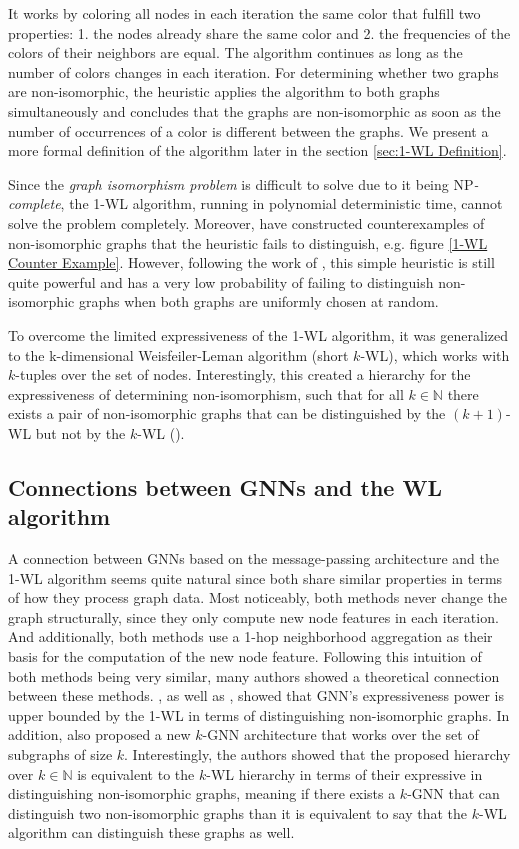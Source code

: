 \documentclass[11pt, dvipsnames, DIV=12]{scrreprt}
\theoremstyle{definition}
\begin{document}
It works by coloring all nodes in each iteration the same color that fulfill two properties: 1. the nodes already share the same color and 2. the frequencies of the colors of their neighbors are equal. The algorithm continues as long as the number of colors changes in each iteration.
For determining whether two graphs are non-isomorphic, the heuristic applies the algorithm to both graphs simultaneously and concludes that the graphs are non-isomorphic as soon as the number of occurrences of a color is different between the graphs. We present a more formal definition of the algorithm later in the section \ref{sec:1-WL Definition}.

Since the \textit{graph isomorphism problem} is difficult to solve due to it being \textsf{NP}\textit{-complete}, the 1-WL algorithm, running in polynomial deterministic time, cannot solve the problem completely. Moreover, \cite{Cai1992} have constructed counterexamples of non-isomorphic graphs that the heuristic fails to distinguish, e.g. figure \ref{1-WL Counter Example}. However, following the work of \cite{Bab+1979}, this simple heuristic is still quite powerful and has a very low probability of failing to distinguish non-isomorphic graphs when both graphs are uniformly chosen at random.

To overcome the limited expressiveness of the 1-WL algorithm, it was generalized to the k-dimensional Weisfeiler-Leman algorithm (short $k$-WL), which works with $k$-tuples over the set of nodes. Interestingly, this created a hierarchy for the expressiveness of determining non-isomorphism, such that for all $k \in \mathbb{N}$ there exists a pair of non-isomorphic graphs that can be distinguished by the $(k+1)$-WL but not by the $k$-WL (\cite{Cai1992}).

\subsection{Connections between GNNs and the WL algorithm}\label{sec:conn gnn and 1wl}
A connection between GNNs based on the message-passing architecture and the 1-WL algorithm seems quite natural since both share similar properties in terms of how they process graph data. Most noticeably, both methods never change the graph structurally, since they only compute new node features in each iteration. And additionally, both methods use a 1-hop neighborhood aggregation as their basis for the computation of the new node feature. Following this intuition of both methods being very similar, many authors showed a theoretical connection between these methods. \cite{Morris2018}, as well as \cite{Xu2018}, showed that GNN's expressiveness power is upper bounded by the 1-WL in terms of distinguishing non-isomorphic graphs. In addition, \cite{Morris2018} also proposed a new $k$-GNN architecture that works over the set of subgraphs of size $k$. Interestingly, the authors showed that the proposed hierarchy over $k \in \mathbb{N}$ is equivalent to the $k$-WL hierarchy in terms of their expressive in distinguishing non-isomorphic graphs, meaning if there exists a $k$-GNN that can distinguish two non-isomorphic graphs than it is equivalent to say that the $k$-WL algorithm can distinguish these graphs as well.
\end{document}
